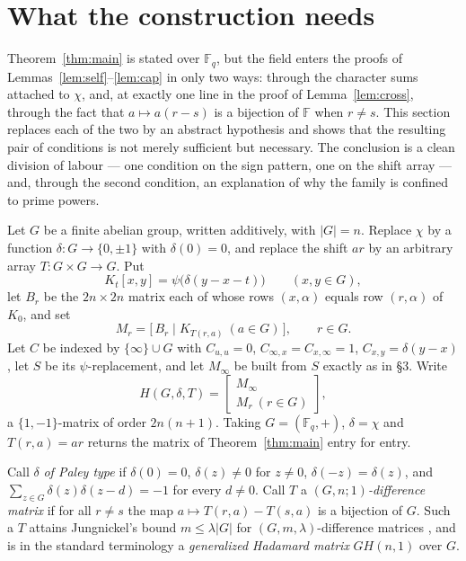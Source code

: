 \documentclass[11pt]{article}
\newcommand{\F}{\mathbb F}
\begin{document}
\section{What the construction needs}\label{sec:char}

Theorem~\ref{thm:main} is stated over \(\F_q\), but the field enters the
proofs of Lemmas~\ref{lem:self}--\ref{lem:cap} in only two ways: through the
character sums attached to \(\chi\), and, at exactly one line in the proof of
Lemma~\ref{lem:cross}, through the fact that \(a\mapsto a(r-s)\) is a
bijection of \(\F\) when \(r\neq s\).  This section replaces each of the two
by an abstract hypothesis and shows that the resulting pair of conditions is
not merely sufficient but necessary.  The conclusion is a clean division of
labour --- one condition on the sign pattern, one on the shift array --- and,
through the second condition, an explanation of why the family is confined to
prime powers.

Let \(G\) be a finite abelian group, written additively, with \(|G|=n\).
Replace \(\chi\) by a function \(\delta\colon G\to\{0,\pm1\}\) with
\(\delta(0)=0\), and replace the shift \(ar\) by an arbitrary array
\(T\colon G\times G\to G\).  Put
\[
        K_t[x,y]=\psi\bigl(\delta(y-x-t)\bigr)\qquad(x,y\in G),
\]
let \(B_r\) be the \(2n\times2n\) matrix each of whose rows \((x,\alpha)\)
equals row \((r,\alpha)\) of \(K_0\), and set
\[
        M_r=\bigl[\,B_r\mid K_{T(r,a)}\ (a\in G)\,\bigr],\qquad r\in G .
\]
Let \(C\) be indexed by \(\{\infty\}\cup G\) with \(C_{u,u}=0\),
\(C_{\infty,x}=C_{x,\infty}=1\), \(C_{x,y}=\delta(y-x)\), let \(S\) be its
\(\psi\)-replacement, and let \(M_\infty\) be built from \(S\) exactly as in
\S3.  Write
\[
        H(G,\delta,T)=\begin{bmatrix}M_\infty\\ M_r\ (r\in G)\end{bmatrix},
\]
a \(\{1,-1\}\)-matrix of order \(2n(n+1)\).  Taking \(G=(\F_q,+)\),
\(\delta=\chi\) and \(T(r,a)=ar\) returns the matrix of
Theorem~\ref{thm:main} entry for entry.

Call \(\delta\) \emph{of Paley type} if \(\delta(0)=0\),
\(\delta(z)\neq0\) for \(z\neq0\), \(\delta(-z)=\delta(z)\), and
\(\sum_{z\in G}\delta(z)\delta(z-d)=-1\) for every \(d\neq0\).  Call \(T\) a \emph{\((G,n;1)\)-difference matrix} if for
all \(r\neq s\) the map \(a\mapsto T(r,a)-T(s,a)\) is a bijection of \(G\).
Such a \(T\) attains Jungnickel's bound \(m\le\lambda|G|\) for
\((G,m,\lambda)\)-difference matrices \cite[Thm.~2.2]{Jungnickel1979}, and
is in the standard terminology a \emph{generalized Hadamard matrix}
\(GH(n,1)\) over \(G\).
\end{document}
